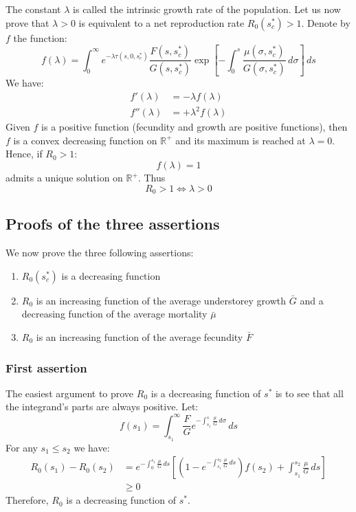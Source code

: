 \documentclass[letterpaper, 12pt]{article}
\newcommand {\s}{{s}^{*}}
\newcommand{\R}{\mathds{R}}
\theoremstyle{theo}
\begin{document}
\begin{refsection}
\begin{onehalfspace}
The constant $ \lambda $ is called the intrinsic growth rate of the population. Let us now prove that $ \lambda > 0 $ is equivalent to a net reproduction rate $ R_0(\s_c) > 1 $. Denote by $ f $ the function:
\[
	f(\lambda) = \int_{0}^{\infty} e^{- \lambda \tau(s, 0, \s_c)} \frac{F(s, \s_c)}{G(s, \s_c)} \exp \left[ -\int_{0}^{s} \frac{\mu(\sigma, \s_c)}{G(\sigma, \s_c)} \, d\sigma \right] \, ds
\]
We have:
\begin{align*}
	f'(\lambda) &= -\lambda f(\lambda) \\
	f''(\lambda) &= +\lambda^2 f(\lambda)
\end{align*}
Given $ f $ is a positive function (fecundity and growth are positive functions), then $ f $ is a convex decreasing function on $ \R^{+} $ and its maximum is reached at $ \lambda = 0 $. Hence, if $ R_0 > 1 $:
\[
	f(\lambda) = 1
\]
admits a unique solution on $ \R^{+} $. Thus
\[
	R_0 > 1 \Leftrightarrow \lambda > 0
\]

\subsection{Proofs of the three assertions \label{app::calc_R0::sec::3asser}}
We now prove the three following assertions:
\begin{enumerate}[label=(\textit{\roman*})]
	\item $ R_0(\s_c) $ is a decreasing function
	\item $ R_0 $ is an increasing function of the average understorey growth $ \bar{G} $ and a decreasing function of the average mortality $ \bar{\mu} $
	\item $ R_0 $ is an increasing function of the average fecundity $ \bar{F} $
\end{enumerate}

\subsubsection{First assertion}
The easiest argument to prove $ R_0 $ is a decreasing function of $ \s $ is to see that all the integrand's parts are always positive. Let:
\[
	f(s_1) = \int_{s_1}^{\infty} \frac{F}{G} e^{-\int_{s_1}^s \frac{\mu}{G} \, d\sigma} \, ds
\]
For any $ s_1 \leqslant s_2 $ we have:
\begin{align*}
	R_0(s_1) - R_0(s_2) &= e^{-\int_{0}^{s_1} \frac{\mu}{G} \, ds} \left[ \left( 1 - e^{-\int_{s_1}^{s_2} \frac{\mu}{G} \, ds} \right) f(s_2) + \int_{s_1}^{s_2} \frac{\mu}{G} \, ds \right] \\
		&\geqslant 0
\end{align*}
Therefore, $ R_0 $ is a decreasing function of $ \s $.


\end{onehalfspace}
\end{refsection}
\end{document}
